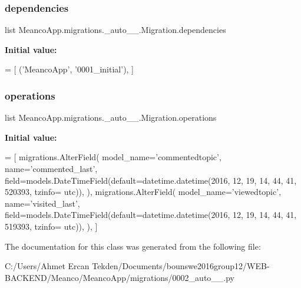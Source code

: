 \subsubsection{\texorpdfstring{dependencies}{dependencies}}
{\footnotesize\ttfamily list Meanco\+App.\+migrations.\+\_\+auto\+\_\+\_.\+Migration.\+dependencies\hspace{0.3cm}{\ttfamily [static]}}

{\bfseries Initial value\+:}
\begin{DoxyCode}
=  [
        (\textcolor{stringliteral}{'MeancoApp'}, \textcolor{stringliteral}{'0001\_initial'}),
    ]
\end{DoxyCode}
\hypertarget{class_meanco_app_1_1migrations_1_10002__auto__20161219__1744_1_1_migration_a5de7b8b21726d119a986058c57cd4e18}{}\label{class_meanco_app_1_1migrations_1_10002__auto__20161219__1744_1_1_migration_a5de7b8b21726d119a986058c57cd4e18} 
\subsubsection{\texorpdfstring{operations}{operations}}
{\footnotesize\ttfamily list Meanco\+App.\+migrations.\+\_\+auto\+\_\+\_.\+Migration.\+operations\hspace{0.3cm}{\ttfamily [static]}}

{\bfseries Initial value\+:}
\begin{DoxyCode}
=  [
        migrations.AlterField(
            model\_name=\textcolor{stringliteral}{'commentedtopic'},
            name=\textcolor{stringliteral}{'commented\_last'},
            field=models.DateTimeField(default=datetime.datetime(2016, 12, 19, 14, 44, 41, 520393, tzinfo=
      utc)),
        ),
        migrations.AlterField(
            model\_name=\textcolor{stringliteral}{'viewedtopic'},
            name=\textcolor{stringliteral}{'visited\_last'},
            field=models.DateTimeField(default=datetime.datetime(2016, 12, 19, 14, 44, 41, 519393, tzinfo=
      utc)),
        ),
    ]
\end{DoxyCode}


The documentation for this class was generated from the following file\+:\begin{DoxyCompactItemize}
\item 
C\+:/\+Users/\+Ahmet Ercan Tekden/\+Documents/bounswe2016group12/\+W\+E\+B-\/\+B\+A\+C\+K\+E\+N\+D/\+Meanco/\+Meanco\+App/migrations/0002\+\_\+auto\+\_\+\_.\+py\end{DoxyCompactItemize}
